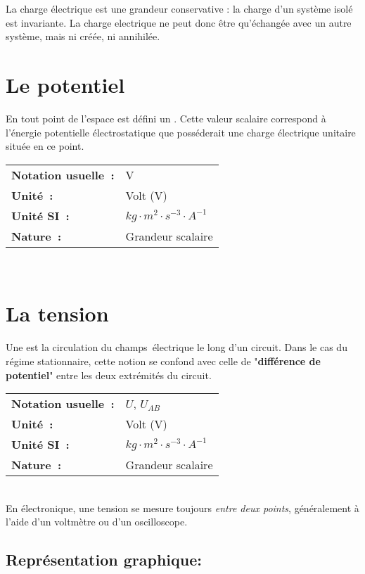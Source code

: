 La charge électrique est une grandeur conservative : la charge d'un système isolé est invariante. La charge electrique ne peut donc être qu'échangée avec un autre système, mais ni créée, ni annihilée.

\section{Le potentiel}

En tout point de l'espace est défini un . Cette valeur scalaire correspond à l'énergie potentielle électrostatique que posséderait une charge électrique unitaire située en ce point. \\

\begin{tabular}{ll}
\textbf{Notation usuelle~:} & V \\
	\textbf{Unité~:} & Volt (V)\\
\textbf{Unité SI~:} & ${kg} \cdot m^2 \cdot {s}^{-3} \cdot A^{-1}$ \\
\textbf{Nature~:} & Grandeur scalaire 
\end{tabular}\\

\section{La tension}

Une  est la circulation du champs électrique le long d'un circuit. Dans le cas du régime stationnaire, cette notion se confond avec celle de "\textbf{différence de potentiel}" entre les deux extrémités du circuit. \\

\begin{tabular}{ll}
\textbf{Notation usuelle~:} & $U$, $U_{AB}$ \\
	\textbf{Unité~:} & Volt (V) \\
\textbf{Unité SI~:} & ${kg} \cdot m^2 \cdot {s}^{-3} \cdot A^{-1}$ \\
\textbf{Nature~:} & Grandeur scalaire \\
\end{tabular} \\

En électronique, une tension se mesure toujours \emph{entre deux points}, généralement à l'aide d'un voltmètre ou d'un oscilloscope. 

\subsection*{Représentation graphique: }

